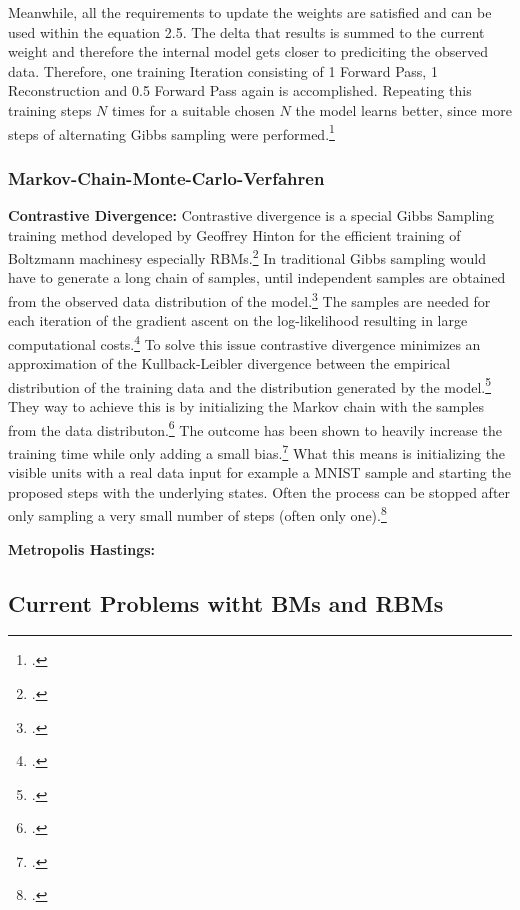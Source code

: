 Meanwhile, all the requirements to update the weights are satisfied and can be used within the equation 2.5. 
The delta that results is summed to the current weight and therefore the internal model gets closer to prediciting the observed data.
Therefore, one training Iteration consisting of 1 Forward Pass, 1 Reconstruction and 0.5 Forward Pass again is accomplished.
Repeating this training steps \( N \) times for a suitable chosen \( N \) the model learns better, since more steps of alternating Gibbs sampling were performed.\footcite[Vgl.][6]{huembeliPhysicsEnergybasedModels2022}


\subsubsection{Markov-Chain-Monte-Carlo-Verfahren}

\textbf{Contrastive Divergence:} Contrastive divergence is a special Gibbs Sampling training method
developed by Geoffrey Hinton for the efficient training of Boltzmann machinesy especially \ac{RBM}s.\footcite[Vgl.][4-5]{hintonPracticalGuideTraining2012}
In traditional Gibbs sampling would have to generate a long chain of samples, until
independent samples are obtained from the observed data distribution of the model.\footcite[Vgl.][5-6]{huembeliPhysicsEnergybasedModels2022}
The samples are needed for each iteration of the gradient ascent on the log-likelihood
resulting in large computational costs.\footcite[Vgl.][7-8]{upadhyaOverviewRestrictedBoltzmann2019}
To solve this issue contrastive divergence minimizes an approximation of the Kullback-Leibler divergence between the empirical distribution of the training data and the distribution generated by the model.\footcite[Vgl.][246]{mocanuTopologicalInsightRestricted2016}
They way to achieve this is by initializing the Markov chain with the samples from the data distributon.\footcite[Vgl.][7-8]{upadhyaOverviewRestrictedBoltzmann2019}
The outcome has been shown to heavily increase the training time while only adding a small bias.\footcite[Vgl.][537]{larochelleClassificationUsingDiscriminative2008}
What this means is initializing the visible units with a real data input for example a MNIST sample and starting the proposed steps with the underlying states.
Often the process can be stopped after only sampling a very small number of steps (often only one).\footcite[Vgl.][646]{larochelleLearningAlgorithmsClassification2012}


\textbf{Metropolis Hastings:}

\subsection{Current Problems witht BMs and RBMs}

